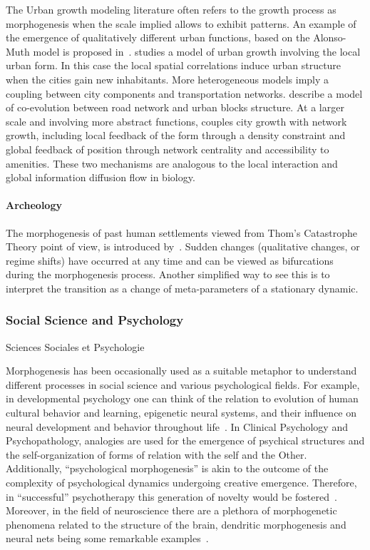 The Urban growth modeling literature often refers to the growth process as morphogenesis when the scale implied allows to exhibit patterns. An example of the emergence of qualitatively different urban functions, based on the Alonso-Muth model is proposed in~\cite{bonin2012modele}. \cite{makse1998modeling} studies a model of urban growth involving the local urban form. In this case the local spatial correlations induce urban structure when the cities gain new inhabitants. More heterogeneous models imply a coupling between city components and transportation networks. \cite{achibet2014model} describe a model of co-evolution between road network and urban blocks structure. At a larger scale and involving more abstract functions, \cite{raimbault2014hybrid} couples city growth with network growth, including local feedback of the form through a density constraint and global feedback of position through network centrality and accessibility to amenities. These two mechanisms are analogous to the local interaction and global information diffusion flow in biology.


\paragraph{Archeology}{}

The morphogenesis of past human settlements viewed from Thom's Catastrophe Theory point of view, is introduced by~\cite{renfrew1978trajectory}. Sudden changes (qualitative changes, or regime shifts) have occurred at any time and can be viewed as bifurcations during the morphogenesis process. Another simplified way to see this is to interpret the transition as a change of meta-parameters of a stationary dynamic.






\subsubsection*{Social Science and Psychology}{Sciences Sociales et Psychologie}



Morphogenesis has been occasionally used as a suitable metaphor to understand different processes in social science and various psychological fields. For example, in developmental psychology one can think of the relation to evolution of human cultural behavior and learning, epigenetic neural systems, and their influence on neural development and behavior throughout life~\cite{hart_held_2013}. In Clinical Psychology and Psychopathology, analogies are used for the emergence of psychical structures and the self-organization of forms of relation with the self and the Other. Additionally, “psychological morphogenesis” is akin to the outcome of the complexity of psychological dynamics undergoing creative emergence. Therefore, in “successful” psychotherapy this generation of novelty would be fostered~\cite{piers_self-organizing_2007}. Moreover, in the field of neuroscience there are a plethora of morphogenetic phenomena related to the structure of the brain, dendritic morphogenesis and neural nets being some remarkable examples~\cite{_issues_2013}.

